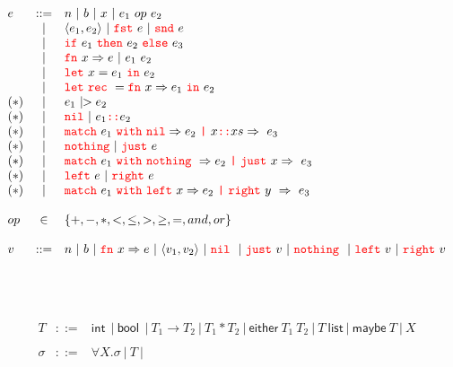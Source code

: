 \documentclass[a4paper,12pt]{report}
\newcommand{\sintaxe}[1]{{\texttt{\textcolor{red}{#1}}}}
\newcommand{\IF}{\sintaxe{if}}
\newcommand{\THEN}{\sintaxe{then}}
\newcommand{\ELSE}{\sintaxe{else}}
\newcommand{\FN}{\sintaxe{fn}}
\newcommand{\LET}{\sintaxe{let}}
\newcommand{\REC}{\sintaxe{rec}}
\newcommand{\IN}{\sintaxe{in}}
\newcommand{\INT}{\ensuremath{\textsf{int}}}
\newcommand{\BOOL}{\ensuremath{\textsf{bool}}}
\newcommand{\NIL}{\sintaxe{nil}}
\newcommand{\MATCH}{\sintaxe{match}}
\newcommand{\WITH}{\sintaxe{with}}
\newcommand{\FST}{\sintaxe{fst}}
\newcommand{\SND}{\sintaxe{snd}}
\newcommand{\LIST}{\ensuremath{\textsf{list}}}
\newcommand{\MAYBE}{\ensuremath{\textsf{maybe}}}
\newcommand{\EITHER}{\ensuremath{\textsf{either}}}
\newcommand{\LEFT}{\sintaxe{left}}
\newcommand{\RIGHT}{\sintaxe{right}}
\newcommand{\NOTHING}{\sintaxe{nothing}}
\newcommand{\JUST}{\sintaxe{just}}
\begin{document}
\\ 


\[ 
\begin{array}{lcl}
e &  ::=   &  n ~ | ~   b ~ | ~ x ~ |~   e_1 \ op \ e_2\\
  & |   &  \langle e_1, e_2 \rangle ~ | ~  \FST  \  e  ~ | ~  \SND \ e \\
   & |   &   \IF \ e_1 \ \THEN  \ e_2 \ \ELSE \  e_3\\
   &~| ~ &  \FN \ x \Rightarrow  e ~ | ~  e_1 \ e_2 \\
  & ~| ~&  \LET \ x  =  e_1 \ \IN \  e_2 \\
  &~ | ~  & \LET \ \REC \ = \FN \ x \Rightarrow  e_1 \ \IN \ e_2   \\
(*) &~ | ~ &  e_1 \ {\small{|}}\!\!> e_2\\
(*)  &~ | ~  &  \NIL ~ | ~  e_1 \sintaxe{::} e_2  \\
(*)   & ~| ~  & \MATCH \ e_1 \ \WITH \ \NIL \Rightarrow e_2 \ \sintaxe{|}\  x\sintaxe{::} xs \Rightarrow \ e_3  \\
(*)     &~ | ~  & \NOTHING  ~| ~ \JUST\ e   \\ 
(*)    & ~| ~  & \MATCH \ e_1 \ \WITH \ \NOTHING\ \Rightarrow e_2 \ \sintaxe{|}\  \JUST\ x  \Rightarrow \ e_3\\
(*)       &~ | ~  & \LEFT\ e  ~| ~ \RIGHT\ e \\ 
 (*)   & ~| ~  & \MATCH \ e_1 \ \WITH \ \LEFT\ x  \Rightarrow e_2 \ \sintaxe{|}\  \RIGHT\  y \   \Rightarrow \ e_3\\
   & & \\
 op & \in & \{ +, -, \ast, <, \leq, >, \geq, =, and, or\} \\
 & & \\
 v & ::= & n  ~ | ~ b ~ | ~ \FN \ x \Rightarrow e  ~ | ~ \langle v_1, v_2 \rangle
 ~ | ~  \NIL\ ~ | ~ \JUST\ v ~ | ~  \NOTHING\ ~ | ~  \LEFT\ v ~ | ~  \RIGHT\ v\\
 \end{array}
 \]

 \ 

 
\\ 


 \[
 \begin{array}{lcl}
 T & ::= & \INT\ ~ | ~  \BOOL\ ~ | ~  T_1 \to T_2  ~ | ~  T_1 * T_2  ~ | ~ \EITHER\ T_1 ~T_2 ~ | ~  T  ~   \LIST ~ | ~ \MAYBE\ T ~| ~X\\
  & & \\
 \sigma & ::= & \forall X. \sigma  ~ | ~ T ~ | ~ 
\end{array}
 \]
\end{document}
